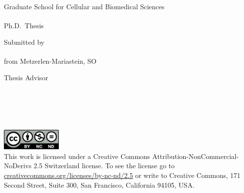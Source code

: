 \begin{titlepage}
	\begin{addmargin}[-1cm]{-3cm}
	\begin{center}
	\large

		\vfill

		\begingroup
			\color{Maroon}\spacedallcaps{\myTitle} \\ \bigskip
		\endgroup
		\myDegree \\
		\bigskip
		Graduate School for Cellular and Biomedical Sciences\\
		\myUni\\
		Ph.D.\ Thesis 

		\vfill


		Submitted by\\
		\medskip
		\spacedallcaps{\myName}\\
		\medskip
		from Metzerlen-Mariastein, SO\\

		\vfill

		Thesis Advisor\\
		\medskip
		\myProf \\
		\myDepartment \\
		\myFaculty \\
		\myUni \\
		\bigskip
		\myTime \\
		\vfill
		\includegraphics[width=3cm]{img/by-nc-nd}\\
		This work is licensed under a Creative Commons Attribution-NonCommercial-NoDerivs 2.5 Switzerland  license. To see the license go to \href{http://creativecommons.org/licenses/by-nc-nd/2.5/ch/deed.en_SG}{creativecommons.org/licenses/by-nc-nd/2.5} or write to Creative Commons, 171 Second Street, Suite 300, San Francisco, California 94105, USA.
	\end{center}
	\end{addmargin}
\end{titlepage}